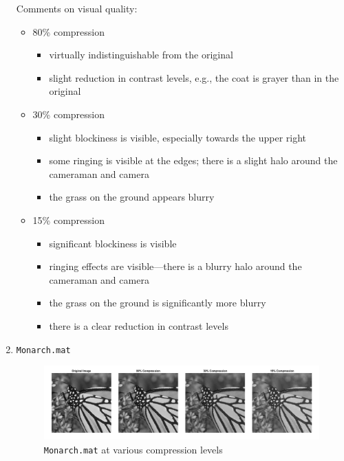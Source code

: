 \documentclass{article}[a4paper]
\begin{document}
\begin{enumerate}
\begin{tcolorbox}
			Comments on visual quality:
			\begin{itemize}
				\item 80\% compression
				\begin{itemize}
					\item virtually indistinguishable from the original
					\item slight reduction in contrast levels, e.g., the coat is grayer than in the original
				\end{itemize}
				\item 30\% compression
				\begin{itemize}
					\item slight blockiness is visible, especially towards the upper right
					\item some ringing is visible at the edges; there is a slight halo around the cameraman and camera
					\item the grass on the ground appears blurry
				\end{itemize}
				\item 15\% compression
				\begin{itemize}
					\item significant blockiness is visible
					\item ringing effects are visible---there is a blurry halo around the cameraman and camera
					\item the grass on the ground is significantly more blurry
					\item there is a clear reduction in contrast levels
				\end{itemize}
			\end{itemize}
		\end{tcolorbox}
		
%			
		\vspace{0.5 em}
		
		\item \texttt{Monarch.mat}
		
		\begin{tcolorbox}
			\begin{figure}[H]
				\centering
				\includegraphics[width=\linewidth]{images/monarch.png}
				\caption{\texttt{Monarch.mat} at various compression levels}
				\label{monarch}
			\end{figure}
		\end{tcolorbox}
		

\end{enumerate}
\end{document}
